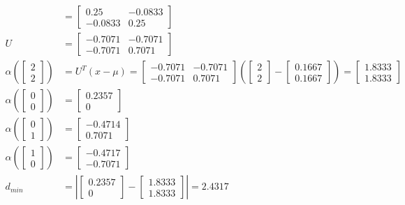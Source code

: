 \documentclass[fleqn]{article}
\begin{document}
\begin{description}
\begin{align*}
             &= \begin{bmatrix} 0.25 & -0.0833 \\ -0.0833 & 0.25 \end{bmatrix} \\
        U &= \begin{bmatrix} -0.7071 & -0.7071 \\ -0.7071 & 0.7071 \end{bmatrix} \\
        \alpha \left ( \begin{bmatrix}2 \\ 2\end{bmatrix} \right )
            &= U^T(x - \mu) = \begin{bmatrix} -0.7071 & -0.7071 \\ -0.7071 & 0.7071 \end{bmatrix}
            \left ( \begin{bmatrix}2 \\ 2\end{bmatrix} - \begin{bmatrix} 0.1667 \\ 0.1667 \end{bmatrix} \right )
            = \begin{bmatrix} 1.8333 \\  1.8333 \end{bmatrix} \\
        \alpha \left ( \begin{bmatrix}0 \\ 0\end{bmatrix} \right ) &= \begin{bmatrix}  0.2357 \\  0 \end{bmatrix} \\
        \alpha \left ( \begin{bmatrix}0 \\ 1\end{bmatrix} \right ) &= \begin{bmatrix} -0.4714 \\  0.7071 \end{bmatrix} \\
        \alpha \left ( \begin{bmatrix}1 \\ 0\end{bmatrix} \right ) &= \begin{bmatrix} -0.4717 \\ -0.7071 \end{bmatrix} \\
        d_{min} &= \left | \begin{bmatrix} 0.2357 \\ 0 \end{bmatrix} - \begin{bmatrix} 1.8333 \\  1.8333 \end{bmatrix} \right | = 2.4317 \\
    \end{align*}


\end{description}
\end{document}
